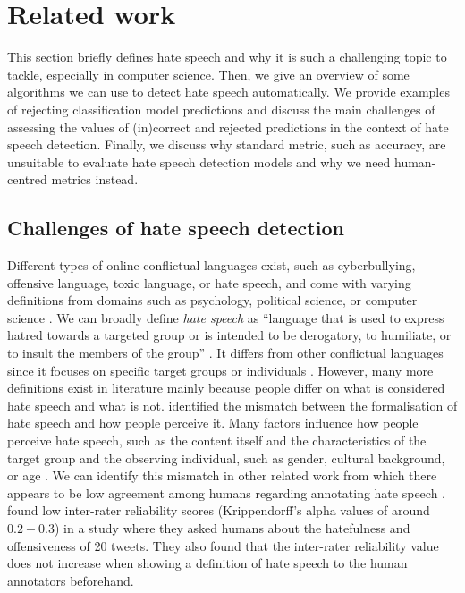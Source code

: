 \chapter{Related work}
This section briefly defines hate speech and why it is such a challenging topic to tackle, especially in computer science.
%
Then, we give an overview of some algorithms we can use to detect hate speech automatically.
%
We provide examples of rejecting classification model predictions and discuss the main challenges of assessing the values of (in)correct and rejected predictions in the context of hate speech detection.
%
Finally, we discuss why standard metric, such as accuracy, are unsuitable to evaluate hate speech detection models and why we need human-centred metrics instead.

\section{Challenges of hate speech detection}
Different types of online conflictual languages exist, such as cyberbullying, offensive language, toxic language, or hate speech, and come with varying definitions from domains such as psychology, political science, or computer science \citep{balayn2021automatic}.
%
We can broadly define \textit{hate speech} as ``language that is used to express hatred towards a targeted group or is intended to be derogatory, to humiliate, or to insult the members of the group'' \citep{davidson2017automated, balayn2021automatic}.
%
It differs from other conflictual languages since it focuses on specific target groups or individuals \citep{balayn2021automatic}.
%
However, many more definitions exist in literature mainly because people differ on what is considered hate speech and what is not.
%
\citet{balayn2021automatic} identified the mismatch between the formalisation of hate speech and how people perceive it.
%
Many factors influence how people perceive hate speech, such as the content itself and the characteristics of the target group and the observing individual, such as gender, cultural background, or age \citep{balayn2021automatic}.
%
We can identify this mismatch in other related work from which there appears to be low agreement among humans regarding annotating hate speech \citep{fortuna2018survey, ross2017measuring, waseem2016you}.
%
\citet{ross2017measuring} found low inter-rater reliability scores (Krippendorff's alpha values of around $0.2-0.3$) in a study where they asked humans about the hatefulness and offensiveness of 20 tweets.
%
They also found that the inter-rater reliability value does not increase when showing a definition of hate speech to the human annotators beforehand.
